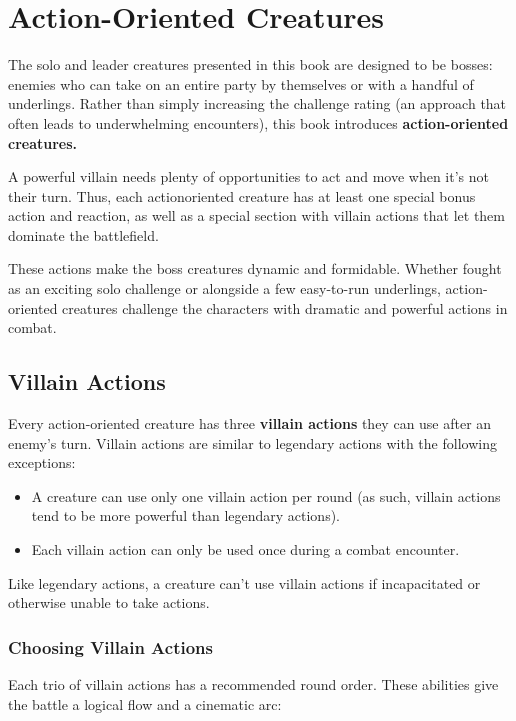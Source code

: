 \documentclass[10pt,a4paper,twoside,bg=print,twocolumn,openany,nodeprecatedcode]{dndbook}
\begin{document}
\section{Action-Oriented Creatures}
The solo and leader creatures presented in this book are designed to be bosses: enemies who can take on an entire party by themselves or with a handful of underlings. Rather than simply increasing the challenge rating (an approach that often leads to underwhelming encounters), this book introduces \textbf{action-oriented creatures.}

A powerful villain needs plenty of opportunities to act and move when it's not their turn. Thus, each actionoriented creature has at least one special bonus action and reaction, as well as a special section with villain actions that let them dominate the battlefield.

These actions make the boss creatures dynamic and formidable. Whether fought as an exciting solo challenge or alongside a few easy-to-run underlings, action-oriented creatures challenge the characters with dramatic and powerful actions in combat.

\subsection{Villain Actions}
Every action-oriented creature has three \textbf{villain actions} they can use after an enemy's turn. Villain actions are similar to legendary actions with the following exceptions:


\begin{itemize}
\item A creature can use only one villain action per round (as such, villain actions tend to be more powerful than legendary actions).
\item Each villain action can only be used once during a combat encounter.
\end{itemize}

Like legendary actions, a creature can't use villain actions if incapacitated or otherwise unable to take actions.

\subsubsection{Choosing Villain Actions}
Each trio of villain actions has a recommended round order. These abilities give the battle a logical flow and a cinematic arc:
\end{document}
